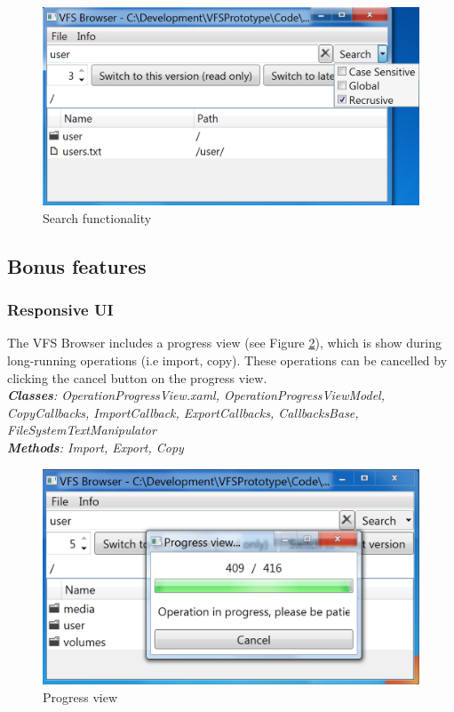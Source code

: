 \documentclass[JCDReport.tex]{subfiles}
\begin{document}
\begin{figure}[h!]
  \centering
  \includegraphics[scale=0.35]{Images/search.png} 
  \caption{Search functionality}
  \label{img:searchFunctions}
\end{figure}


\subsection{Bonus features}

\subsubsection{Responsive UI}
The VFS Browser includes a progress view (see Figure \ref{img:progressView}), which is show during long-running operations (i.e import, copy). These operations can be cancelled by clicking the cancel button on the progress view.\\
\textit{\textbf{Classes}: OperationProgressView.xaml, OperationProgressViewModel, CopyCallbacks, ImportCallback, ExportCallbacks, CallbacksBase, FileSystemTextManipulator\\
\textbf{Methods}: Import, Export, Copy}

\begin{figure}[h!]
  \centering
  \includegraphics[scale=0.35]{Images/progress.png} 
  \caption{Progress view}
  \label{img:progressView}
\end{figure}
\end{document}
